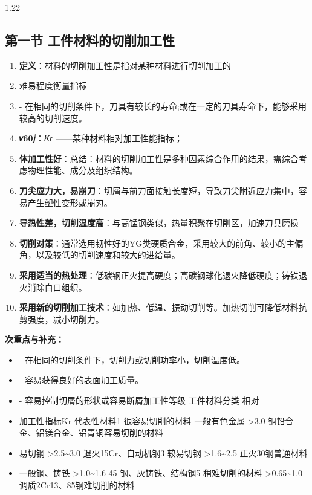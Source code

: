 \documentclass[12pt,a4paper]{article}
\begin{document}
\begin{spacing}{1.22}
\subsection{第一节 工件材料的切削加工性}
\begin{tcolorbox}[colback=yellow!6,colframe=red!55!black,title=重点,left=1mm,right=1mm]
\begin{enumerate}[leftmargin=2.2em,label=\arabic*.]
  \item \textbf{定义}：材料的切削加工性是指对某种材料进行切削加工的
  \item 难易程度衡量指标
  \item - 在相同的切削条件下，刀具有较长的寿命;或在一定的刀具寿命下，能够采用较高的切削速度。
  \item \textbf{𝑣60𝑗}：𝐾𝑟 ——某种材料相对加工性能指标；
  \item \textbf{体加工性好}：总结：材料的切削加工性是多种因素综合作用的结果，需综合考虑物理性能、成分及组织结构。
  \item \textbf{刀尖应力大，易崩刀}：切屑与前刀面接触长度短，导致刀尖附近应力集中，容易产生塑性变形或崩刃。
  \item \textbf{导热性差，切削温度高}：与高锰钢类似，热量积聚在切削区，加速刀具磨损
  \item \textbf{切削对策}：通常选用韧性好的YG类硬质合金，采用较大的前角、较小的主偏角，以及较低的切削速度和较大的进给量。
  \item \textbf{采用适当的热处理}：低碳钢正火提高硬度；高碳钢球化退火降低硬度；铸铁退火消除白口组织。
  \item \textbf{采用新的切削加工技术}：如加热、低温、振动切削等。加热切削可降低材料抗剪强度，减小切削力。
\end{enumerate}
\end{tcolorbox}
\noindent\textbf{次重点与补充：}
\begin{itemize}[leftmargin=2.2em,label=--]
  \item - 在相同的切削条件下，切削力或切削功率小，切削温度低。
  \item - 容易获得良好的表面加工质量。
  \item - 容易控制切屑的形状或容易断屑加工性等级 工件材料分类 相对
  \item 加工性指标Kr 代表性材料1 很容易切削的材料 一般有色金属 >3.0 铜铅合金、铝镁合金、铝青铜容易切削的材料
  \item 易切钢 >2.5\textasciitilde{}3.0 退火15Cr、自动机钢3 较易切钢 >1.6\textasciitilde{}2.5 正火30钢普通材料
  \item 一般钢、铸铁 >1.0\textasciitilde{}1.6 45 钢、灰铸铁、结构钢5 稍难切削的材料 >0.65\textasciitilde{}1.0 调质2Cr13、85钢难切削的材料

\end{itemize}
\end{spacing}
\end{document}
